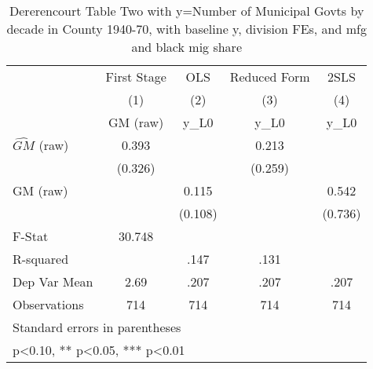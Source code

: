 \begin{table}[htbp]\centering
\def\sym#1{\ifmmode^{#1}\else\(^{#1}\)\fi}
\caption{Dererencourt Table Two with y=Number of Municipal Govts by decade in County 1940-70, with baseline y, division FEs, and mfg and black mig share}
\begin{tabular}{l*{4}{c}}
\toprule
                    & First Stage   &         OLS   &Reduced Form   &        2SLS   \\
                    &\multicolumn{1}{c}{(1)}&\multicolumn{1}{c}{(2)}&\multicolumn{1}{c}{(3)}&\multicolumn{1}{c}{(4)}\\
                    &\multicolumn{1}{c}{GM  (raw)}&\multicolumn{1}{c}{y\_L0}&\multicolumn{1}{c}{y\_L0}&\multicolumn{1}{c}{y\_L0}\\
\midrule
$\hat{GM}$ (raw)    &       0.393   &               &       0.213   &               \\
                    &     (0.326)   &               &     (0.259)   &               \\
\addlinespace
GM  (raw)           &               &       0.115   &               &       0.542   \\
                    &               &     (0.108)   &               &     (0.736)   \\
\midrule
F-Stat              &      30.748   &               &               &               \\
R-squared           &               &        .147   &        .131   &               \\
Dep Var Mean        &        2.69   &        .207   &        .207   &        .207   \\
Observations        &         714   &         714   &         714   &         714   \\
\bottomrule
\multicolumn{5}{l}{\footnotesize Standard errors in parentheses}\\
\multicolumn{5}{l}{\footnotesize * p<0.10, ** p<0.05, *** p<0.01}\\
\end{tabular}
\end{table}
